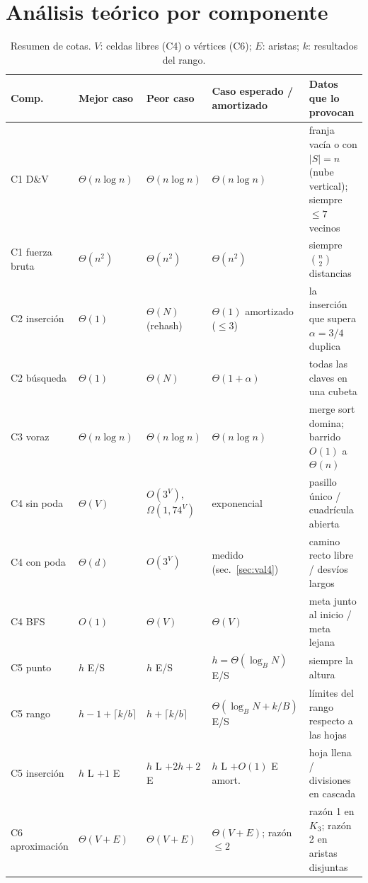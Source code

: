 \documentclass[11pt,letterpaper]{article}
\theoremstyle{plain}
\theoremstyle{definition}
\newcommand{\Th}{\Theta}
\newcommand{\Om}{\Omega}
\begin{document}
\section{Análisis teórico por componente}\label{sec:teoria}

\begin{table}[H]
\centering\small
\caption{Resumen de cotas. $V$: celdas libres (C4) o vértices (C6); $E$: aristas; $k$: resultados del rango.}
\label{tab:cotas}
\begin{tabularx}{\linewidth}{l l l l >{\raggedright\arraybackslash}X}
\toprule
Comp. & Mejor caso & Peor caso & Caso esperado / amortizado & Datos que lo provocan \\
\midrule
C1 D\&V & $\Th(n\log n)$ & $\Th(n\log n)$ & $\Th(n\log n)$ & franja vacía o con $|S|=n$ (nube vertical); siempre $\le7$ vecinos \\
C1 fuerza bruta & $\Th(n^2)$ & $\Th(n^2)$ & $\Th(n^2)$ & siempre $\binom n2$ distancias \\
C2 inserción & $\Th(1)$ & $\Th(N)$ (rehash) & $\Th(1)$ amortizado ($\le3$) & la inserción que supera $\alpha=3/4$ duplica \\
C2 búsqueda & $\Th(1)$ & $\Th(N)$ & $\Th(1+\alpha)$ & todas las claves en una cubeta \\
C3 voraz & $\Th(n\log n)$ & $\Th(n\log n)$ & $\Th(n\log n)$ & merge sort domina; barrido $O(1)$ a $\Th(n)$ \\
C4 sin poda & $\Th(V)$ & $O(3^V)$, $\Om(1{,}74^{V})$ & exponencial & pasillo único / cuadrícula abierta \\
C4 con poda & $\Th(d)$ & $O(3^V)$ & medido (sec.~\ref{sec:val4}) & camino recto libre / desvíos largos \\
C4 BFS & $O(1)$ & $\Th(V)$ & $\Th(V)$ & meta junto al inicio / meta lejana \\
C5 punto & $h$ E/S & $h$ E/S & $h=\Th(\log_B N)$ E/S & siempre la altura \\
C5 rango & $h-1+\lceil k/b\rceil$ & $h+\lceil k/b\rceil$ & $\Th(\log_B N + k/B)$ E/S & límites del rango respecto a las hojas \\
C5 inserción & $h$ L $+1$ E & $h$ L $+2h+2$ E & $h$ L $+O(1)$ E amort. & hoja llena / divisiones en cascada \\
C6 aproximación & $\Th(V+E)$ & $\Th(V+E)$ & $\Th(V+E)$; razón $\le2$ & razón 1 en $K_3$; razón 2 en aristas disjuntas \\
\bottomrule
\end{tabularx}
\end{table}
\end{document}
